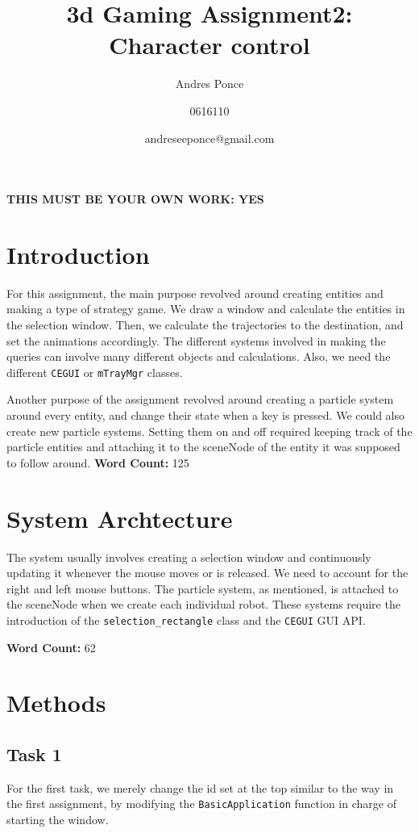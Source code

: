 \documentclass{article}
\author{Andres Ponce\\
	\and
	0616110\\
	\and	
	andreseeponce@gmail.com
}
\title{3d Gaming Assignment2: Character control}
\begin{document}
\maketitle

\textbf{THIS MUST BE YOUR OWN WORK: YES}
\section{Introduction}
For this assignment, the main purpose revolved around creating entities and making
a type of strategy game. We draw a window and calculate the entities in the 
selection window. Then, we calculate the trajectories to the destination, and set the 
animations accordingly. The different systems involved in making the queries can involve
many different objects and calculations. Also, we need the different \texttt{CEGUI} or 
\texttt{mTrayMgr} classes.

Another purpose of the assignment revolved around creating a particle system around every
entity, and change their state when a key is pressed. We could also create new particle 
systems. Setting them on and off required keeping track of the particle entities and attaching
it to the sceneNode of the entity it was supposed to follow around.
\textbf{Word Count:} 125

\section{System Archtecture}

The system usually involves creating a selection window and continuously updating it whenever
the mouse moves or is released. We need to account for the right and left mouse buttons. The particle
system, as mentioned, is attached to the sceneNode when we create each individual robot. These systems 
require the introduction of the \texttt{selection\_rectangle} class and the \texttt{CEGUI} GUI API.

\textbf{Word Count: } 62

\section{Methods}
\subsection{Task 1}
For the first task, we merely change the id set at the top similar to the way in the first assignment, 
by modifying the \texttt{BasicApplication} function in charge of starting the window.
\end{document}
